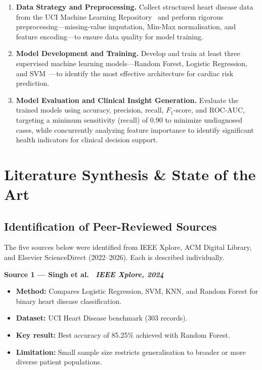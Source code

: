 \documentclass[12pt, a4paper]{article}
\begin{document}
\begin{enumerate}
  \item \textbf{Data Strategy and Preprocessing.} Collect structured heart
    disease data from the UCI Machine Learning Repository~\cite{uci_heart} and
    perform rigorous preprocessing---missing-value imputation, Min-Max
    normalisation, and feature encoding---to ensure data quality for model
    training.

  \item \textbf{Model Development and Training.} Develop and train at least
    three supervised machine learning models---Random Forest, Logistic
    Regression, and SVM~\cite{rf_heart2021}---to identify the
    most effective architecture for cardiac risk prediction.

  \item \textbf{Model Evaluation and Clinical Insight Generation.} Evaluate the trained models using accuracy, precision, recall, $F_1$-score, and ROC-AUC, targeting a minimum sensitivity (recall) of $0.90$ to minimize undiagnosed cases, while concurrently analyzing feature importance to identify significant health indicators for clinical decision support.
\end{enumerate}

\section{Literature Synthesis \& State of the Art}

\subsection{Identification of Peer-Reviewed Sources}

The five sources below were identified from IEEE Xplore, ACM Digital Library,
and Elsevier ScienceDirect (2022--2026). Each is described individually.

\medskip
\noindent\textbf{Source 1 --- Singh et al.\ \cite{singh2024} \hfill \textit{IEEE Xplore, 2024}}
\begin{itemize}
  \item \textbf{Method:} Compares Logistic Regression, SVM, KNN, and Random Forest
        for binary heart disease classification.
  \item \textbf{Dataset:} UCI Heart Disease benchmark (303 records).
  \item \textbf{Key result:} Best accuracy of 85.25\% achieved with Random Forest.
  \item \textbf{Limitation:} Small sample size restricts generalisation to broader
        or more diverse patient populations.
\end{itemize}
\end{document}
